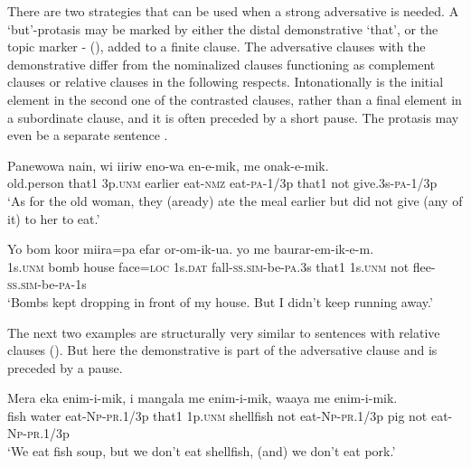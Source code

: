 There are two strategies that can be used when a strong adversative is needed. A `but'-protasis \citep[237]{Reesink1983b} may be marked by either the distal demonstrative  `that', or the topic marker - (), added to a finite clause. The adversative clauses with the demonstrative  differ from the nominalized clauses functioning as complement clauses or relative clauses in the following respects. Intonationally  is the initial element in the second one of the contrasted clauses, rather than a final element in a subordinate clause, and it is often preceded by a short pause. The protasis may even be a separate sentence . 

\ea%
\label{ex:8:x1395}
\gll Panewowa  nain,  wi  iiriw  eno-wa  en-e-mik,    me onak-e-mik.\\
old.person  that1  3p.\textsc{unm}  earlier  eat-\textsc{nmz}  eat-\textsc{pa}-1/3p  that1  not give.3s-\textsc{pa}-1/3p\\
\glt`As for the old woman, they (aready) ate the meal earlier but did not give (any of it) to her to eat.'
\z


\ea%
\label{ex:8:x728}
\gll Yo  bom  koor  miira=pa  efar  or-om-ik-ua.   yo  me  baurar-em-ik-e-m. \\
1s.\textsc{unm}  bomb  house  face=\textsc{loc}  1s.\textsc{dat}  fall-\textsc{ss}.\textsc{sim}-be-\textsc{pa}.3s that1  1s.\textsc{unm}  not flee-\textsc{ss}.\textsc{sim}-be-\textsc{pa}-1s     \\
\glt`Bombs kept dropping in front of my house. But I didn't keep running away.'
\z


The next two examples are structurally very similar to sentences with relative clauses (). But here the demonstrative  is part of the adversative clause and is preceded by a pause. 

\ea%
\label{ex:8:x1389}
\gll Mera  eka  enim-i-mik,    i  mangala me  enim-i-mik,  waaya  me  enim-i-mik.\\
fish  water  eat-\textsc{Np}-\textsc{pr}.1/3p  that1  1p.\textsc{unm}  shellfish not  eat-\textsc{Np}-\textsc{pr}.1/3p  pig  not  eat-\textsc{Np}-\textsc{pr}.1/3p\\
\glt`We eat fish soup, but we don't eat shellfish, (and) we don't eat pork.'
\z


